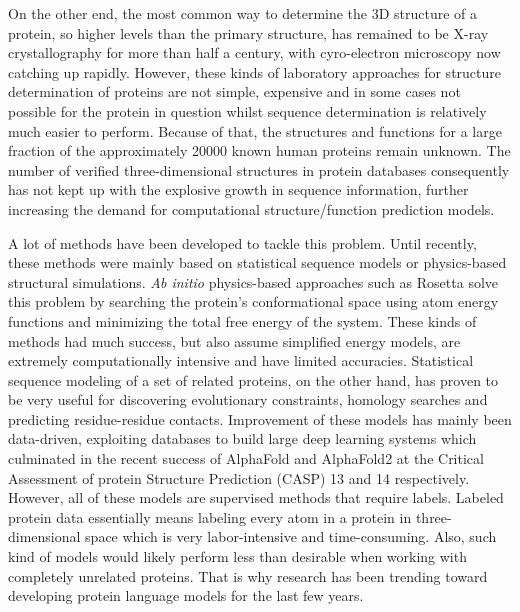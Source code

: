 On the other end, the most common way to determine the 3D structure of a protein, so higher levels than the primary structure, has remained to be X-ray crystallography for more than half a century\cite{xray}, with cyro-electron microscopy now catching up rapidly\cite{cyroem}. However, these kinds of laboratory approaches for structure determination of proteins are not simple, expensive and in some cases not possible for the protein in question whilst sequence determination is relatively much easier to perform. Because of that, the structures and functions for a large fraction of the approximately 20000 known human proteins remain unknown. The number of verified three-dimensional structures in protein databases consequently has not kept up with the explosive growth in sequence information, further increasing the demand for computational structure/function prediction models.

A lot of methods have been developed to tackle this problem. Until recently, these methods were mainly based on statistical sequence models or physics-based structural simulations. \textit{Ab initio} physics-based approaches such as Rosetta\cite{rosetta} solve this problem by searching the protein's conformational space using atom energy functions and minimizing the total free energy of the system. These kinds of methods had much success, but also assume simplified energy models, are extremely computationally intensive and have limited accuracies\cite{review}. Statistical sequence modeling of a set of related proteins, on the other hand, has proven to be very useful for discovering evolutionary constraints, homology searches and predicting residue-residue contacts. Improvement of these models has mainly been data-driven, exploiting databases to build large deep learning systems which culminated in the recent success of AlphaFold\cite{alphafold} and AlphaFold2\cite{alphafold2} at the Critical Assessment of protein Structure Prediction (CASP) 13 and 14 respectively. However, all of these models are supervised methods that require labels. Labeled protein data essentially means labeling every atom in a protein in three-dimensional space which is very labor-intensive and time-consuming. Also, such kind of models would likely perform less than desirable when working with completely unrelated proteins. That is why research has been trending toward developing protein language models for the last few years.